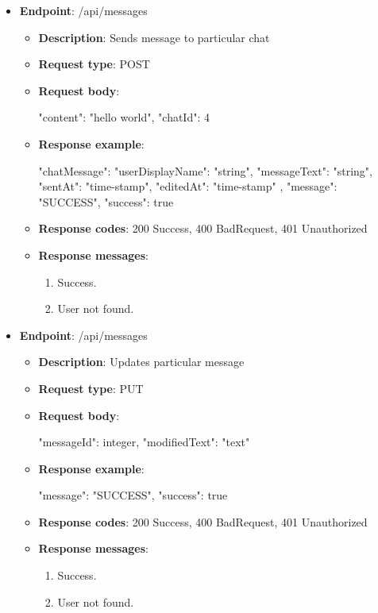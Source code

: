 \begin{itemize}
    \item \textbf{Endpoint}: /api/messages
    \begin{itemize}
        \item \textbf{Description}: Sends message to particular chat
        \item \textbf{Request type}: POST
        \item \textbf{Request body}:
        \begin{spverbatim}
        {
            "content": "hello world",
            "chatId": 4
        }
        \end{spverbatim}
        \item \textbf{Response example}:
        \begin{spverbatim}
        {
            "chatMessage": {
            "userDisplayName": "string",
            "messageText": "string",
            "sentAt": "time-stamp",
            "editedAt": "time-stamp"
            },
            "message": "SUCCESS",
            "success": true
        }
        \end{spverbatim}
        \item \textbf{Response codes}: 200 Success, 400 BadRequest, 401 Unauthorized
        \item \textbf{Response messages}:
        \begin{enumerate}
            \item Success.
            \item User not found.
        \end{enumerate}
    \end{itemize}

    \item \textbf{Endpoint}: /api/messages
    \begin{itemize}
        \item \textbf{Description}: Updates particular message
        \item \textbf{Request type}: PUT
        \item \textbf{Request body}:
        \begin{spverbatim}
        {
            "messageId": integer,
            "modifiedText": "text"
        }
        \end{spverbatim}
        \item \textbf{Response example}:
        \begin{spverbatim}
        {
            "message": "SUCCESS",
            "success": true
        }
        \end{spverbatim}
        \item \textbf{Response codes}: 200 Success, 400 BadRequest, 401 Unauthorized
        \item \textbf{Response messages}:
        \begin{enumerate}
            \item Success.
            \item User not found.
        \end{enumerate}
    \end{itemize}


\end{itemize}
